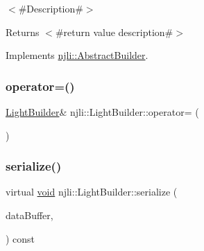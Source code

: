 $<$\#\+Description\#$>$

\begin{DoxyReturn}{Returns}
$<$\#return value description\#$>$ 
\end{DoxyReturn}


Implements \mbox{\hyperlink{classnjli_1_1_abstract_builder_a3e6e553e06d1ca30517ad5fb0bd4d000}{njli\+::\+Abstract\+Builder}}.

\mbox{\label{classnjli_1_1_light_builder_a60818643979ebb467edf749bfac23dec}} 
\subsubsection{\texorpdfstring{operator=()}{operator=()}}
{\footnotesize\ttfamily \mbox{\hyperlink{classnjli_1_1_light_builder}{Light\+Builder}}\& njli\+::\+Light\+Builder\+::operator= (\begin{DoxyParamCaption}\item[{const \mbox{\hyperlink{classnjli_1_1_light_builder}{Light\+Builder}} \&}]{ }\end{DoxyParamCaption})\hspace{0.3cm}{\ttfamily [protected]}}

\mbox{\label{classnjli_1_1_light_builder_abe9991f05d3425a49d57143219651944}} 
\subsubsection{\texorpdfstring{serialize()}{serialize()}}
{\footnotesize\ttfamily virtual \mbox{\hyperlink{_thread_8h_af1e856da2e658414cb2456cb6f7ebc66}{void}} njli\+::\+Light\+Builder\+::serialize (\begin{DoxyParamCaption}\item[{\mbox{\hyperlink{_thread_8h_af1e856da2e658414cb2456cb6f7ebc66}{void}} $\ast$}]{data\+Buffer,  }\item[{bt\+Serializer $\ast$}]{ }\end{DoxyParamCaption}) const\hspace{0.3cm}{\ttfamily [virtual]}}



